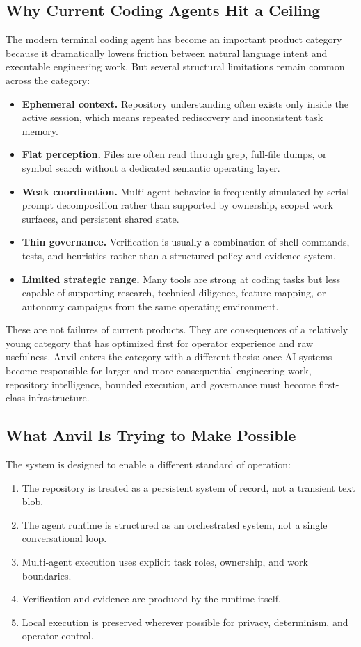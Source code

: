 \documentclass[11pt,a4paper]{article}
\begin{document}
\subsection{Why Current Coding Agents Hit a Ceiling}
The modern terminal coding agent has become an important product category because it dramatically lowers friction between natural language intent and executable engineering work. But several structural limitations remain common across the category:
\begin{itemize}
    \item \textbf{Ephemeral context.} Repository understanding often exists only inside the active session, which means repeated rediscovery and inconsistent task memory.
    \item \textbf{Flat perception.} Files are often read through grep, full-file dumps, or symbol search without a dedicated semantic operating layer.
    \item \textbf{Weak coordination.} Multi-agent behavior is frequently simulated by serial prompt decomposition rather than supported by ownership, scoped work surfaces, and persistent shared state.
    \item \textbf{Thin governance.} Verification is usually a combination of shell commands, tests, and heuristics rather than a structured policy and evidence system.
    \item \textbf{Limited strategic range.} Many tools are strong at coding tasks but less capable of supporting research, technical diligence, feature mapping, or autonomy campaigns from the same operating environment.
\end{itemize}

These are not failures of current products. They are consequences of a relatively young category that has optimized first for operator experience and raw usefulness. Anvil enters the category with a different thesis: once AI systems become responsible for larger and more consequential engineering work, repository intelligence, bounded execution, and governance must become first-class infrastructure.

\subsection{What Anvil Is Trying to Make Possible}
The system is designed to enable a different standard of operation:
\begin{enumerate}
    \item The repository is treated as a persistent system of record, not a transient text blob.
    \item The agent runtime is structured as an orchestrated system, not a single conversational loop.
    \item Multi-agent execution uses explicit task roles, ownership, and work boundaries.
    \item Verification and evidence are produced by the runtime itself.
    \item Local execution is preserved wherever possible for privacy, determinism, and operator control.
\end{enumerate}
\end{document}
